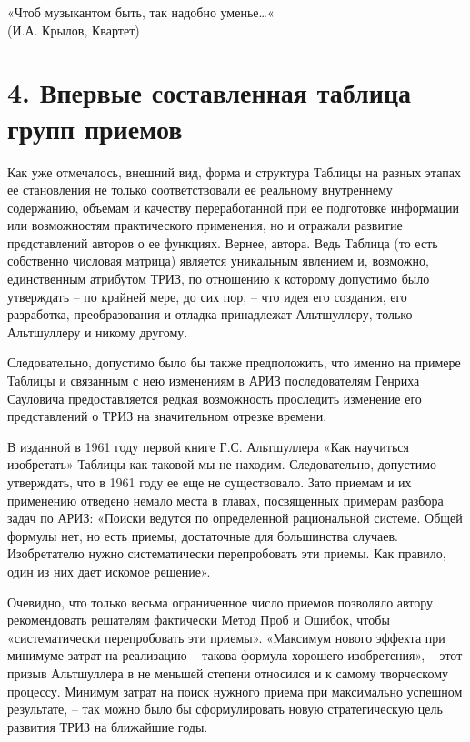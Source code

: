 \documentclass[11pt,a4paper]{article}
\begin{document}
\begin{flushright}
  «Чтоб музыкантом быть, так надобно уменье…«\\
  (И.А. Крылов, Квартет)
\end{flushright}
\section*{4. Впервые составленная таблица групп приемов}

Как уже отмечалось, внешний вид, форма и структура Таблицы на разных этапах ее
становления не только соответствовали ее реальному внутреннему содержанию,
объемам и качеству переработанной при ее подготовке информации или
возможностям практического применения, но и отражали развитие представлений
авторов о ее функциях. Вернее, автора. Ведь Таблица (то есть собственно
числовая матрица) является уникальным явлением и, возможно, единственным
атрибутом ТРИЗ, по отношению к которому допустимо было утверждать -- по
крайней мере, до сих пор, -- что идея его создания, его разработка,
преобразования и отладка принадлежат Альтшуллеру, только Альтшуллеру и никому
другому.

Следовательно, допустимо было бы также предположить, что именно на примере
Таблицы и связанным с нею изменениям в АРИЗ последователям Генриха Сауловича
предоставляется редкая возможность проследить изменение его представлений о
ТРИЗ на значительном отрезке времени.

В изданной в 1961 году первой книге Г.С. Альтшуллера «Как научиться
изобретать» \cite{Altshuller1961} Таблицы как таковой мы не находим.
Следовательно, допустимо утверждать, что в 1961 году ее еще не существовало.
Зато приемам и их применению отведено немало места в главах, посвященных
примерам разбора задач по АРИЗ: «Поиски ведутся по определенной рациональной
системе. Общей формулы нет, но есть приемы, достаточные для большинства
случаев. Изобретателю нужно систематически перепробовать эти приемы. Как
правило, один из них дает искомое решение».

Очевидно, что только весьма ограниченное число приемов позволяло автору
рекомендовать решателям фактически Метод Проб и Ошибок, чтобы «систематически
перепробовать эти приемы». «Максимум нового эффекта при минимуме затрат на
реализацию -- такова формула хорошего изобретения», -- этот призыв Альтшуллера
в не меньшей степени относился и к самому творческому процессу. Минимум затрат
на поиск нужного приема при максимально успешном результате, -- так можно было
бы сформулировать новую стратегическую цель развития ТРИЗ на ближайшие годы.
\end{document}
